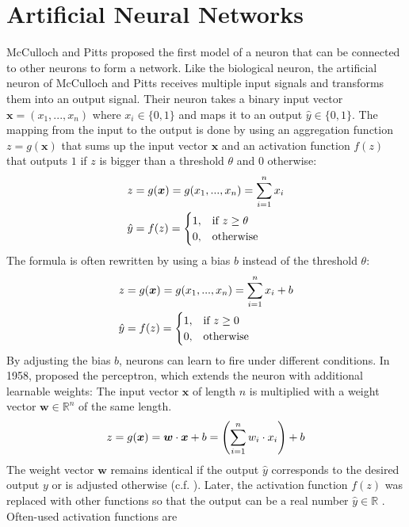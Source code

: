 \section{Artificial Neural Networks}
McCulloch and Pitts  proposed the first model of a neuron that can be connected to other neurons to form a network.
Like the biological neuron, the artificial neuron of McCulloch and Pitts receives multiple input signals and transforms them into an output signal.
Their neuron takes a binary input vector $\boldsymbol{x} = (x_1, ..., x_n)$ where $x_i \in \{0, 1\}$ and maps it to an output $\hat{y} \in \{0, 1\}$.
The mapping from the input to the output is done by using an aggregation function $z = g(\boldsymbol{x})$ that sums up the input vector $\boldsymbol{x}$ and an activation function $f(z)$ that outputs $1$ if $z$ is bigger than a threshold $\theta$ and $0$ otherwise:
%
\begin{align}\eqlbl{McCulloch_Pitts_agg}%
	z &= g(\boldsymbol{x}) = g(x_1, ..., x_n) = \sum_{i=1}^{n}x_i\\
		\hat{y} &= f(z) = \begin{cases}
      		1, & \text{if}\ z \geq \theta \\
      		0, & \text{otherwise}
    	\end{cases}
\end{align}
%
The formula is often rewritten by using a bias $b$ instead of the  threshold $\theta$:
%
\begin{align}\eqlbl{McCulloch_Pitts_agg2}%
	z &= g(\boldsymbol{x}) = g(x_1, ..., x_n) = \sum_{i=1}^{n}x_i + b\\
		\hat{y} &= f(z) = \begin{cases}
      		1, & \text{if}\ z \geq 0 \\
      		0, & \text{otherwise}
    	\end{cases}
\end{align}
%
By adjusting the bias $b$, neurons can learn to fire under different conditions.
In 1958,  proposed the perceptron, which extends the neuron with additional learnable weights: The input vector $\boldsymbol{x}$ of length $n$ is multiplied with a weight vector $\boldsymbol{w} \in \mathbb{R}^n$ of the same length.
%
\begin{align}\eqlbl{nn}%
	z = g(\boldsymbol{x}) = \boldsymbol{w} \cdot \boldsymbol{x} + b = \left( \sum_{i=1}^{n}w_i \cdot x_i \right) + b
\end{align}
%
The weight vector $\boldsymbol{w}$ remains identical if the output $\hat{y}$ corresponds to the desired output $y$ or is adjusted otherwise (c.f. ). Later, the activation function \(f(z)\) was replaced with other functions so that the output can be a real number \(\hat{y} \in \mathbb{R}\) . Often-used activation functions are
